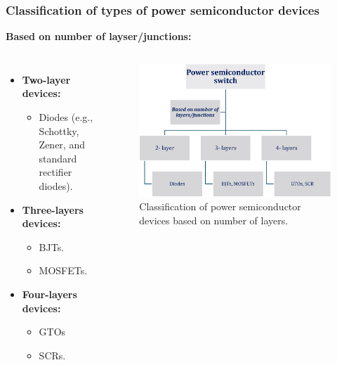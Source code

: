 \begin{frame}
	\frametitle{Classification of types of power semiconductor devices}
    \textbf{Based on number of layser/junctions:}
    \begin{columns}
        \begin{itemize}
            \item \textbf{Two-layer devices:}
            \begin{itemize}
                \item Diodes (e.g., Schottky, Zener, and standard rectifier diodes).
            \end{itemize}
            \item \textbf{Three-layers devices:}
            \begin{itemize}
                \item BJTs.
                \item MOSFETs.
            \end{itemize}
            \item \textbf{Four-layers devices:}
            \begin{itemize}
                \item GTOs
                \item SCRs.
            \end{itemize}
        \end{itemize}

        \begin{figure}
            \centering
            \label{fig:Classification_based_on_number_of_layers}
            \includegraphics[scale=0.35]{fig/lec04/classification_of_device_2.eps}
            \caption{Classification of power semiconductor devices based on number of layers.}
        \end{figure}
    \end{columns}
\end{frame}

